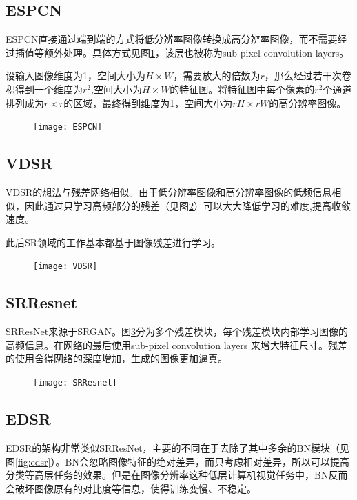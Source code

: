 \documentclass{article}
\begin{document}
\subsection{ESPCN}
ESPCN\cite{ESPCN}直接通过端到端的方式将低分辨率图像转换成高分辨率图像，而不需要经过插值等额外处理。具体方式见图\ref{fig:espcn}，该层也被称为sub-pixel convolution layers。

设输入图像维度为1，空间大小为$H\times W$，需要放大的倍数为$r$，那么经过若干次卷积得到一个维度为$r^2$,空间大小为$H\times W$的特征图。将特征图中每个像素的$r^2$个通道排列成为$r \times r$的区域，最终得到维度为1，空间大小为$rH\times rW$的高分辨率图像。
\begin{figure}
	\centering
	\texttt{[image: ESPCN]}
	\caption{}
	\label{fig:espcn}
\end{figure}

\subsection{VDSR}
VDSR\cite{VDSR}的想法与残差网络相似。由于低分辨率图像和高分辨率图像的低频信息相似，因此通过只学习高频部分的残差（见图\ref{fig:vdsr}）可以大大降低学习的难度,提高收敛速度。

此后SR领域的工作基本都基于图像残差进行学习。
\begin{figure}
	\centering
	\texttt{[image: VDSR]}
	\caption{}
	\label{fig:vdsr}
\end{figure}

\subsection{SRResnet}
SRResNet来源于SRGAN\cite{SRResNet}。图\ref{fig:srresnet}分为多个残差模块，每个残差模块内部学习图像的高频信息。在网络的最后使用sub-pixel convolution layers 来增大特征尺寸。残差的使用舍得网络的深度增加，生成的图像更加逼真。
\begin{figure}
	\centering
	\texttt{[image: SRResnet]}
	\caption{}
	\label{fig:srresnet}
\end{figure}

\subsection{EDSR}
EDSR\cite{EDSR}的架构非常类似SRResNet，主要的不同在于去除了其中多余的BN模块（见图\ref{fig:edsr}）。BN会忽略图像特征的绝对差异，而只考虑相对差异，所以可以提高分类等高层任务的效果。但是在图像分辨率这种低层计算机视觉任务中，BN反而会破坏图像原有的对比度等信息，使得训练变慢、不稳定。
\end{document}
